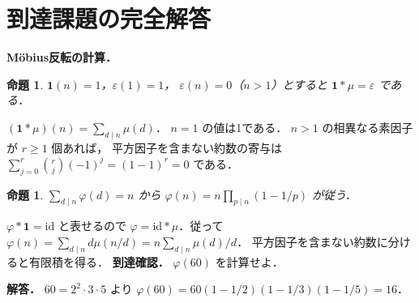 \documentclass[a5paper,10pt,onecolumn]{jsarticle}
\makeatletter
\theoremstyle{mathnotetheorem}
\newtheorem{proposition}[theorem]{命題}
\renewcommand{\proofname}{証明}
\renewenvironment{proof}[1][\proofname]{%
  \par\pushQED{\qed}\normalfont\topsep4\p@\@plus2\p@\relax
  \trivlist\item[\hskip\labelsep\bfseries #1]\ignorespaces
}{\popQED\endtrivlist\@endpefalse}
\makeatother
\begin{document}
\section{到達課題の完全解答}
\noindent\textbf{Möbius反転の計算．}
\begin{proposition}
$\mathbf1(n)=1$，$\varepsilon(1)=1$，
$\varepsilon(n)=0$（$n>1$）とすると
$\mathbf1*\mu=\varepsilon$ である．
\end{proposition}
\begin{proof}
$(\mathbf1*\mu)(n)=\sum_{d\mid n}\mu(d)$．
$n=1$ の値は1である．
$n>1$ の相異なる素因子が $r\ge1$ 個あれば，
平方因子を含まない約数の寄与は
$\sum_{j=0}^r\binom rj(-1)^j=(1-1)^r=0$ である．
\end{proof}
\begin{proposition}
$\sum_{d\mid n}\varphi(d)=n$ から
$\varphi(n)=n\prod_{p\mid n}(1-1/p)$ が従う．
\end{proposition}
\begin{proof}
$\varphi*\mathbf1=\mathrm{id}$ と表せるので
$\varphi=\mathrm{id}*\mu$．従って
$\varphi(n)=\sum_{d\mid n}d\mu(n/d)
=n\sum_{d\mid n}\mu(d)/d$．
平方因子を含まない約数に分けると有限積を得る．
\end{proof}
\noindent\textbf{到達確認．}
$\varphi(60)$ を計算せよ．
\par\noindent\textbf{解答．}
$60=2^2\cdot3\cdot5$ より
$\varphi(60)=60(1-1/2)(1-1/3)(1-1/5)=16$．
\end{document}
